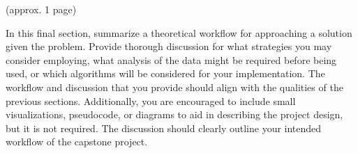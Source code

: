 \documentclass[11pt]{article}
\begin{document}
(approx. 1 page)

In this final section, summarize a theoretical workflow for approaching a solution given the problem. Provide thorough discussion for what strategies you may consider employing, what analysis of the data might be required before being used, or which algorithms will be considered for your implementation. The workflow and discussion that you provide should align with the qualities of the previous sections. Additionally, you are encouraged to include small visualizations, pseudocode, or diagrams to aid in describing the project design, but it is not required. The discussion should clearly outline your intended workflow of the capstone project.
\end{document}
